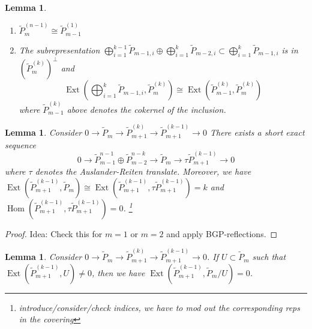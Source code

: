 \documentclass{amsart}
\newtheorem{lemma}[theorem]{Lemma}
\newcommand{\Ext}{\operatorname{Ext}}
\newcommand{\Hom}{\operatorname{Hom}}
\newcommand{\ses}[3]{0\rightarrow #1\rightarrow #2\rightarrow#3\rightarrow 0}
\begin{document}
\begin{lemma}
  \begin{enumerate}
    \item $\tilde P_m^{(n-1)}\cong\tilde P_{m-1}^{(1)}$
    \item The subrepresentation $\bigoplus_{i=1}^{k-1}\tilde P_{m-1,i}\oplus\bigoplus_{i=1}^k\tilde P_{m-2,i}\subset\bigoplus_{i=1}^k\tilde P_{m-1,i}$ is in $(\tilde P_m^{(k)})^\perp$ and
      \[\Ext(\bigoplus_{i=1}^k\tilde P_{m-1,i},\tilde P_m^{(k)})\cong\Ext(\tilde P_{m-1}^{(k)},\tilde P_m^{(k)})\]
      where $\tilde P_{m-1}^{(k)}$ above denotes the cokernel of the inclusion.
  \end{enumerate}
\end{lemma}
\begin{lemma}\label{AR}
Consider $\ses{\tilde P_m}{\tilde P_{m+1}^{(k)}}{\tilde P_{m+1}^{(k-1)}}$
There exists a short exact sequence 
\[\ses{\tilde P_{m-1}^{n-1}\oplus \tilde P_{m-2}^{n-k}}{\tilde P_m}{\tau\tilde P_{m+1}^{(k-1)}}\]
where $\tau$ denotes the Auslander-Reiten translate. Moreover, we have $\Ext(\tilde P_{m+1}^{(k-1)},\tilde P_m)\cong \Ext(\tilde P_{m+1}^{(k-1)},\tau\tilde P_{m+1}^{(k-1)})=k$ and $\Hom(\tilde P_{m+1}^{(k-1)},\tau\tilde P_{m+1}^{(k-1)})=0$.
\footnote{introduce/consider/check indices, we have to mod out the corresponding reps in the covering} 
\end{lemma}
\begin{proof}
Idea: Check this for $m=1$ or $m=2$ and apply BGP-reflections.
\end{proof}
\begin{lemma}\label{quotient}
 Consider $\ses{\tilde P_m}{\tilde P_{m+1}^{(k)}}{\tilde P_{m+1}^{(k-1)}}$. If $U\subset \tilde P_m$ such that $\Ext(\tilde P_{m+1}^{(k-1)},U)\neq 0$, then we have $\Ext(\tilde P_{m+1}^{(k-1)},\tilde P_m/U)= 0$.
\end{lemma}
\end{document}

